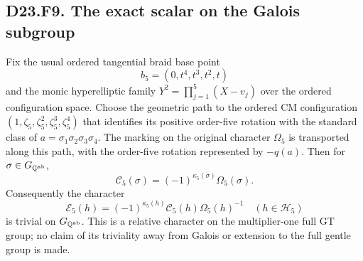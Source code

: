 
\subsection*{D23.F9. The exact scalar on the Galois subgroup}
Fix the usual ordered tangential braid base point
\[
 b_5=(0,t^4,t^3,t^2,t)
\]
and the monic hyperelliptic family
$Y^2=\prod_{j=1}^5(X-v_j)$ over the ordered configuration
space.  Choose the geometric path to the ordered CM
configuration $(1,\zeta_5,\zeta_5^2,\zeta_5^3,\zeta_5^4)$
that identifies its positive order-five rotation with the
standard class of $a=\sigma_1\sigma_2\sigma_3\sigma_4$.
The marking on the original character $\Omega_5$ is transported
along this path, with the order-five rotation represented by
$-q(a)$.  Then for $\sigma\in G_{\mathbb Q^{\rm ab}}$,
\[
 \mathcal C_5(\sigma)
       =(-1)^{\kappa_5(\sigma)}\Omega_5(\sigma).
 \tag{D23.F9.1}
\]
Consequently the character
\[
 \mathcal E_5(h)=(-1)^{\kappa_5(h)}
                  \mathcal C_5(h)\Omega_5(h)^{-1}
 \quad(h\in\mathcal H_5)
\]
is trivial on $G_{\mathbb Q^{\rm ab}}$.  This is a relative
character on the multiplier-one full GT group; no claim of its
triviality away from Galois or extension to the full gentle
group is made.

